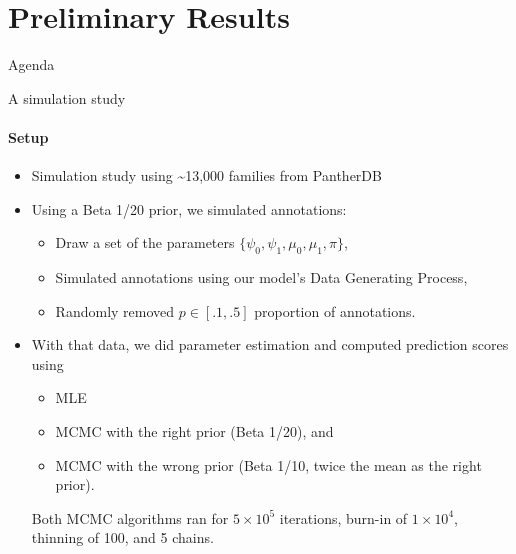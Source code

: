 \documentclass[9pt,ignorenonframetext,]{beamer}
\providecommand{\tightlist}{%
  \setlength{\itemsep}{0pt}\setlength{\parskip}{0pt}}
\begin{document}
\section{Preliminary Results}\label{preliminary-results}

\begin{frame}[t]{Agenda}

\tableofcontents[currentsection]

\end{frame}

\begin{frame}[t,label=sim-setup]{A simulation study}

\framesubtitle{Setup}

\begin{itemize}
\item
  Simulation study using \textasciitilde{}13,000 families from PantherDB
\item
  Using a Beta 1/20 prior, we simulated annotations:

  \begin{itemize}
  \item
    Draw a set of the parameters
    \(\{\psi_0,\psi_1 ,\mu_0, \mu_1,\pi\}\),
  \item
    Simulated annotations using our model's Data Generating Process,
  \item
    Randomly removed \(p\in [.1, .5]\) proportion of annotations.
  \end{itemize}
\item
  With that data, we did parameter estimation and computed prediction
  scores using

  \begin{itemize}
  \tightlist
  \item
    MLE
  \item
    MCMC with the right prior (Beta 1/20), and
  \item
    MCMC with the wrong prior (Beta 1/10, twice the mean as the right
    prior).
  \end{itemize}

  Both MCMC algorithms ran for \(5\times 10^5\) iterations, burn-in of
  \(1\times 10^4\), thinning of 100, and 5 chains.
\end{itemize}

\hyperlink{sim-convergence}{}

\end{frame}
\end{document}
